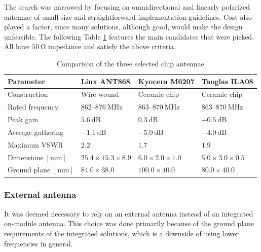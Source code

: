 The search was narrowed by focusing on omnidirectional and linearly polarized antennae of small size and straightforward implementation guidelines. Cost also played a factor, since many solutions, although good, would make the design unfeasible. The following Table \ref{table:antenna-chip} features the main candidates that were picked. All have $50~\mathrm{\Omega}$ impedance and satisfy the above criteria.

\begin{table}
\begin{center}
\caption{\label{table:antenna-chip}Comparison of the three selected chip antennae}
    \begin{tabular}{|l|l|l|l|} \hline
    \textbf{Parameter} & \textbf{Linx ANT868}\cite{linx_technologies_he_2024} & \textbf{Kyocera M6207}\cite{kyocera_ism_2024} & \textbf{Taoglas ILA08}\cite{taoglas_ila08_nodate} \\ \hline
    Construction & Wire wound & Ceramic chip & Ceramic chip \\ \hline
    Rated frequency                 & $862 \text{--} 876~\mathrm{MHz}$ & $863 \text{--} 870~\mathrm{MHz}$ & $863 \text{--} 870~\mathrm{MHz}$ \\ \hline
    Peak gain                       & $5.6~\mathrm{dB}$     & $0.3~\mathrm{dB}$     & $-0.5~\mathrm{dB}$ \\ \hline
    Average gathering               & $-1.1~\mathrm{dB}$    & $-5.0~\mathrm{dB}$    & $-4.0~\mathrm{dB}$ \\ \hline
    Maximum VSWR                    & $2.2$                 & $1.7$                 & $1.9$ \\ \hline
    Dimensions $\mathrm{[mm]}$      & $25.4 \times 15.3 \times 8.9$ & $6.0 \times 2.0 \times 1.0$ & $5.0 \times 3.0 \times 0.5$ \\ \hline
    Ground plane $\mathrm{[mm]}$    & $84.0 \times 38.0$ & $100.0 \times 40.0$ & $80.0 \times 40.0$ \\ \hline
    \end{tabular}
\end{center}
\end{table}

\subsubsection{External antenna}
It was deemed necessary to rely on an external antenna instead of an integrated on-module antenna. This choice was done primarily because of the ground plane requirements of the integrated solutions, which is a downside of using lower frequencies in general.

